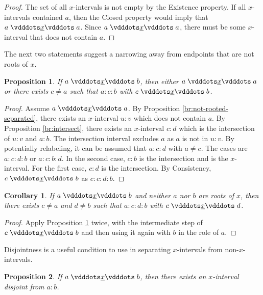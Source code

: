 \documentclass[12pt]{article}
\newtheorem{corollary}{Corollary}[section]
\newtheorem{proposition}{Proposition}[section]
\begin{document}
\begin{proof}
    The set of all $x$-intervals is not empty by the Existence property. If all $x$-intervals contained $a$, then the Closed property would imply that $a \xrel a$. Since  \sout{$a \xrel a$}, there must be some $x$-interval that does not contain $a$. 
\end{proof}

The next two statements suggest a narrowing away from endpoints that are not roots of $x$. 

\begin{proposition}\label{br:something-inside}
    If $a \xrel b$, then either $a \xrel a$ or there exists $c \neq a$ such that $a : c : b$ with $c \xrel b$. 
\end{proposition}

\begin{proof}
    Assume \sout{$a \xrel a$}. By Proposition \ref{br:not-rooted-separated}, there exists an $x$-interval $u:v$ which does not contain $a$. By Proposition \ref{br:intersect}, there exists an $x$-interval  $c:d$ which is the intersection of $u:v$ and $a:b$. The intersection interval excludes $a$ as $a$ is not in $u:v$. By potentially relabeling, it can be assumed that $a:c:d$ with $a \neq c$. The cases are $a:c:d:b$ or $a:c:b:d$. In the second case, $c:b$ is the intersection and is the $x$-interval. For the first case, $c:d$ is the intersection. By Consistency, $c \xrel b$ as $c:c:d:b$. 
\end{proof}

\begin{corollary}\label{br:doublesomething-inside}
    If $a \xrel b$ and neither $a$ nor $b$ are roots of $x$, then there exists $c \neq a$ and $d \neq b$ such that $a : c : d : b$ with $c \xrel d$. 
\end{corollary}

\begin{proof}
Apply Proposition \ref{br:something-inside} twice, with the intermediate step of $c \xrel b$ and then using it again with $b$ in the role of $a$. 
\end{proof}

Disjointness is a useful condition to use in separating $x$-intervals from non-$x$-intervals. 

\begin{proposition}\label{br:something-outside}
    If \sout{$a \xrel b$}, then there exists an $x$-interval disjoint from $a:b$.
\end{proposition}
\end{document}
